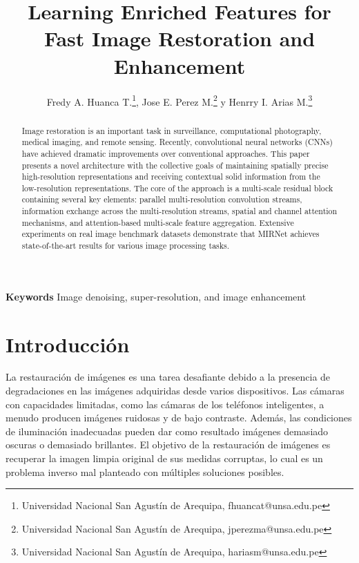 \documentclass[a4paper,
               ]{jacow}
\newenvironment{keywords}
{\par\small\textbf{Keywords}}
{\par}
\begin{document}
\title{Learning Enriched Features for Fast Image Restoration and Enhancement}

\author{Fredy A. Huanca T.\thanks{Universidad Nacional San Agustín de Arequipa, fhuancat@unsa.edu.pe},
		Jose E. Perez M.\thanks{Universidad Nacional San Agustín de Arequipa, jperezma@unsa.edu.pe} y
		Henrry I. Arias M.\thanks{Universidad Nacional San Agustín de Arequipa, hariasm@unsa.edu.pe}}
	
\maketitle

%
\begin{abstract}
Image restoration is an important task in surveillance, computational photography, medical imaging, and remote sensing. Recently, convolutional neural networks (CNNs) have achieved dramatic improvements over conventional approaches. This paper presents a novel architecture with the collective goals of maintaining spatially precise high-resolution representations and receiving contextual solid information from the low-resolution representations. The core of the approach is a multi-scale residual block containing several key elements: parallel multi-resolution convolution streams, information exchange across the multi-resolution streams, spatial and channel attention mechanisms, and attention-based multi-scale feature aggregation. Extensive experiments on real image benchmark datasets demonstrate that MIRNet achieves state-of-the-art results for various image processing tasks.
\end{abstract}

\begin{keywords}
Image denoising, super-resolution, and image enhancement
\end{keywords}

\section{Introducción}

La restauración de imágenes es una tarea desafiante debido a la presencia de degradaciones en las imágenes adquiridas desde varios dispositivos. Las cámaras con capacidades limitadas, como las cámaras de los teléfonos inteligentes, a menudo producen imágenes ruidosas y de bajo contraste. Además, las condiciones de iluminación inadecuadas pueden dar como resultado imágenes demasiado oscuras o demasiado brillantes. El objetivo de la restauración de imágenes es recuperar la imagen limpia original de sus medidas corruptas, lo cual es un problema inverso mal planteado con múltiples soluciones posibles.
\end{document}
